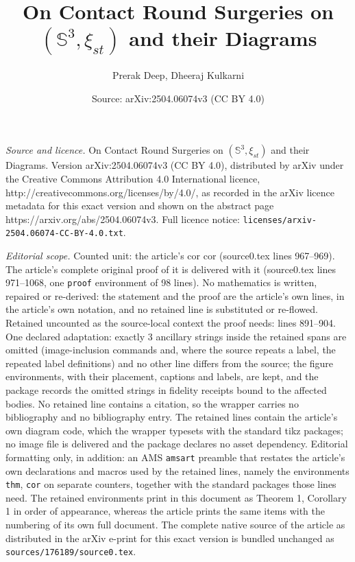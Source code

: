 \documentclass[10pt,a4paper]{amsart}
\title{On Contact Round Surgeries on $(\mathbb{S}^3, \xi_{st})$ and their Diagrams}
\author{Prerak Deep, Dheeraj Kulkarni}
\date{Source: arXiv:2504.06074v3 (CC BY 4.0)}
\begin{document}
\maketitle

\noindent\emph{Source and licence.} On Contact Round Surgeries on $(\mathbb{S}^3, \xi_{st})$ and their Diagrams. Version arXiv:2504.06074v3 (CC BY 4.0), distributed by arXiv under the Creative Commons Attribution 4.0 International licence, http://creativecommons.org/licenses/by/4.0/, as recorded in the arXiv licence metadata for this exact version and shown on the abstract page https://arxiv.org/abs/2504.06074v3. Full licence notice: \texttt{licenses/arxiv-2504.06074-CC-BY-4.0.txt}.\par\smallskip

\noindent\textit{Editorial scope.} Counted unit: the article's cor cor (source0.tex lines 967--969). The article's complete original proof of it is delivered with it (source0.tex lines 971--1068, one \texttt{proof} environment of 98 lines). No mathematics is written, repaired or re-derived: the statement and the proof are the article's own lines, in the article's own notation, and no retained line is substituted or re-flowed.  Retained uncounted as the source-local context the proof needs: lines 891--904.  One declared adaptation: exactly 3 ancillary strings inside the retained spans are omitted (image-inclusion commands and, where the source repeats a label, the repeated label definitions) and no other line differs from the source; the figure environments, with their placement, captions and labels, are kept, and the package records the omitted strings in fidelity receipts bound to the affected bodies.  No retained line contains a citation, so the wrapper carries no bibliography and no bibliography entry.  The retained lines contain the article's own diagram code, which the wrapper typesets with the standard tikz packages; no image file is delivered and the package declares no asset dependency.  Editorial formatting only, in addition: an AMS \texttt{amsart} preamble that restates the article's own declarations and macros used by the retained lines, namely the environments \texttt{thm}, \texttt{cor} on separate counters, together with the standard packages those lines need.  The retained environments print in this document as Theorem 1, Corollary 1 in order of appearance, whereas the article prints the same items with the numbering of its own full document.  The complete native source of the article as distributed in the arXiv e-print for this exact version is bundled unchanged as \texttt{sources/176189/source0.tex}.
\end{document}
